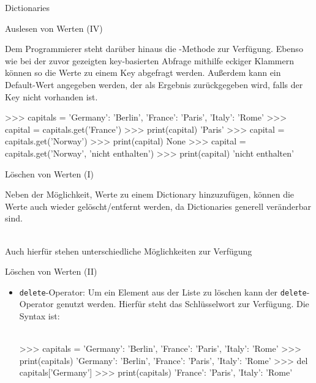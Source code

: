 \begin{subsection}{Dictionaries}
        \begin{frame}[fragile]{Auslesen von Werten (IV)}
            
            Dem Programmierer steht darüber hinaus die -Methode zur Verfügung. Ebenso wie bei der zuvor gezeigten key-basierten Abfrage mithilfe eckiger Klammern können so die Werte zu einem Key abgefragt werden. Außerdem kann ein Default-Wert angegeben werden, der als Ergebnis zurückgegeben wird, falls der Key nicht vorhanden ist.
            
\begin{pyconcode}
>>> capitals = {'Germany': 'Berlin', 'France': 'Paris', 'Italy': 'Rome'}
>>> capital = capitals.get('France')
>>> print(capital)
'Paris'
>>> capital = capitals.get('Norway')
>>> print(capital)
None
>>> capital = capitals.get('Norway', 'nicht enthalten')
>>> print(capital)
'nicht enthalten'
\end{pyconcode}    
                
        
        \end{frame}
    
        \begin{frame}[fragile]{Löschen von Werten (I)}
            
           Neben der Möglichkeit, Werte zu einem Dictionary hinzuzufügen, können die Werte auch wieder gelöscht/entfernt werden, da Dictionaries generell veränderbar sind. \\~\
           
           Auch hierfür stehen unterschiedliche Möglichkeiten zur Verfügung
                
        \end{frame}
        
        \begin{frame}[fragile]{Löschen von Werten (II)}
        
            \begin{itemize}
                \item \texttt{delete}-Operator: Um ein Element aus der Liste zu löschen kann der \texttt{delete}-Operator genutzt werden. Hierfür steht das Schlüsselwort  zur Verfügung. Die Syntax ist: \\~\
                
                
\begin{pyconcode}
>>> capitals = {'Germany': 'Berlin', 'France': 'Paris', 'Italy': 'Rome'}
>>> print(capitals)
{'Germany': 'Berlin', 'France': 'Paris', 'Italy': 'Rome'}
>>> del capitals['Germany']
>>> print(capitals)
{'France': 'Paris', 'Italy': 'Rome'}
\end{pyconcode}  
            \end{itemize}
                

\end{frame}
\end{subsection}

